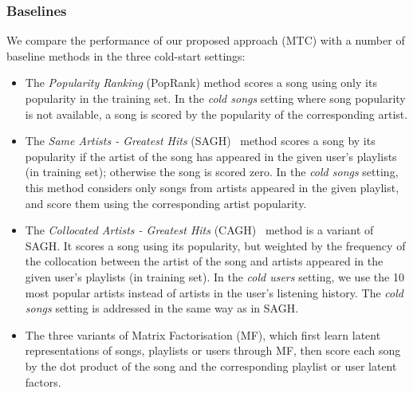 \subsubsection{Baselines}
We compare the performance of our proposed approach (\ie MTC) %
with a number of baseline methods in the three cold-start settings:
\begin{itemize}
\item The {\it Popularity Ranking} (PopRank) method scores a song using only its popularity in the training set.
      In the \emph{cold songs} setting where song popularity is not available, 
      a song is scored by the popularity of the corresponding artist.
\item The {\it Same Artists - Greatest Hits} (SAGH)~\cite{mcfee2012million} method scores a song
      by its popularity if the artist of the song has appeared in the given user's playlists (in training set);
      otherwise the song is scored zero.
      In the {\it cold songs} setting, this method considers only songs from artists appeared in the given playlist,
      and score them using the corresponding artist popularity.
\item The {\it Collocated Artists - Greatest Hits} (CAGH)~\cite{bonnin2013evaluating} method is a variant of SAGH.
      It scores a song using its popularity, but weighted by the frequency of the collocation between the artist of the song
      and artists appeared in the given user's playlists (in training set).
      In the \emph{cold users} setting, we use the 10 most popular artists instead of artists in the user's listening history.
      The \emph{cold songs} setting is addressed in the same way as in SAGH.
\item The three variants of Matrix Factorisation (MF), which first learn latent representations of songs, playlists or users
      through MF, then score each song by the dot product of the song and the corresponding playlist or user latent factors.

\end{itemize}
